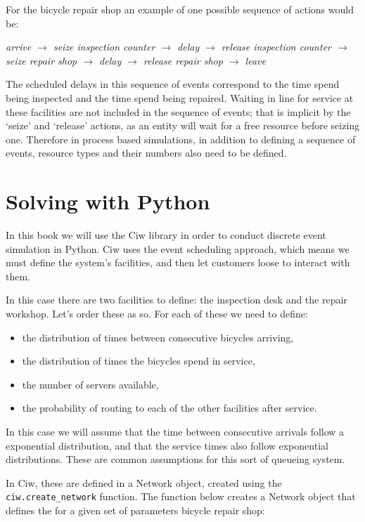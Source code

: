 For the bicycle repair shop an example of one possible sequence of actions would
be:

\textit{arrive $\rightarrow$ seize inspection counter $\rightarrow$ delay $\rightarrow$ release inspection counter $\rightarrow$ seize repair shop $\rightarrow$ delay $\rightarrow$ release repair shop $\rightarrow$ leave}

The scheduled delays in this sequence of events correspond to the time spend
being inspected and the time spend being repaired. Waiting in line for service
at these facilities are not included in the sequence of events; that is implicit
by the `seize' and `release' actions, as an entity will wait for a free resource
before seizing one.
Therefore in process based simulations, in addition to defining a sequence of
events, resource types and their numbers also need to be defined.


\section{Solving with Python}\label{sec:solving-with-python}

In this book we will use the Ciw library in order to conduct discrete event
simulation in Python.
Ciw uses the event scheduling approach, which means we must define the system's
facilities, and then let customers loose to interact with them.

In this case there are two facilities to define: the inspection desk and the
repair workshop. Let's order these as so. For each of these we need to define:

\begin{itemize}
  \item the distribution of times between consecutive bicycles arriving,
  \item the distribution of times the bicycles spend in service,
  \item the number of servers available,
  \item the probability of routing to each of the other facilities after
  service.
\end{itemize}

In this case we will assume that the time between consecutive arrivals follow a
exponential distribution, and that the service times also follow exponential
distributions. These are common assumptions for this sort of queueing system. %

In Ciw, these are defined in a Network object, created using the
\texttt{ciw.create_network} function. The function below
creates a Network object that defines the for a given set of parameters bicycle
repair shop:

